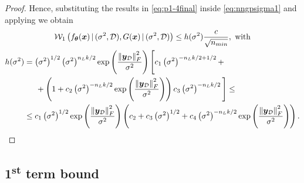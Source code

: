 \documentclass[a4paper, 11pt, reqno]{amsart}
\theoremstyle{plain}
\theoremstyle{remark}
\theoremstyle{definition}
\newcommand{\given}{\, | \,}
\newcommand{\wass}[3][2]{\mathcal{W}_{#1}\left(#2, #3\right)}
\newcommand{\norm}[1]{\left\lVert#1\right\rVert}
\renewcommand{\exp}[1]{\operatorname{exp}\left(#1\right)}
\newcommand{\blankeq}{\kern14.65pt}
\newcommand{\train}{\mathcal{D}}
\begin{document}
\begin{proof}
	Hence, substituting the results in \cref{eq:p1-4final} inside \cref{eq:nngpsigma1} and applying  we obtain
	\begin{equation*}
		\begin{gathered}
			\wass[1]{f_{\bm{\theta}}(\bm{x}) \given (\sigma^2, \train)}{G(\bm{x}) \given (\sigma^2, \train)} \leq h(\sigma^2) \frac{c}{\sqrt{n_{min}}}, \text{ with} \\
			\begin{aligned}
				h(\sigma^2) & = \left(\sigma^2\right)^{1/2} \left(\sigma^2\right)^{n_L k / 2} \exp{\frac{\norm{\bm{y}_{\mathcal{D}}}_F^2}{\sigma^2}} \Bigg[c_1 \left(\sigma^2\right)^{- n_L k / 2 + 1/2} + \\
				& \blankeq + \left(1 + c_2 \left(\sigma^2\right)^{- n_L k / 2} \exp{\frac{\norm{\bm{y}_{\mathcal{D}}}_F^2}{\sigma^2}} \right) c_3 \left(\sigma^2\right)^{- n_L k / 2}\Bigg] \leq \\
				& \leq c_1 \left(\sigma^2\right)^{1/2} \exp{\frac{\norm{\bm{y}_{\mathcal{D}}}_F^2}{\sigma^2}} \left(c_2 + c_3 \left(\sigma^2\right)^{1/2} + c_4 \left(\sigma^2\right)^{- n_L k / 2} \exp{\frac{\norm{\bm{y}_{\mathcal{D}}}_F^2}{\sigma^2}}\right).
			\end{aligned}
		\end{gathered}
	\end{equation*}
\end{proof}

\subsection{\texorpdfstring{1\textsuperscript{st}}{First} term bound} \label{subsec:firstterm}
\end{document}
